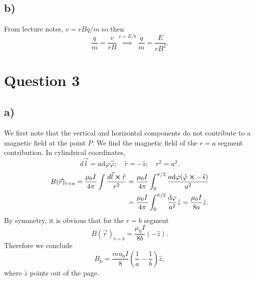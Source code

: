 \documentclass[12pt]{article}
\newcommand{\dr}{\mathrm{d}}
\theoremstyle{definition}
\theoremstyle{definition}
\theoremstyle{definition}
\theoremstyle{definition}
\theoremstyle{definition}
\theoremstyle{example}
\theoremstyle{note}
\theoremstyle{remark}
\theoremstyle{example}
\begin{document}
		\subsection*{b) }
			From lecture notes, $v = rB q / m$ so then 
			$$ \frac{q}{m} = \frac{v}{rB} \overset{v= E/b}{\implies} \frac{q}{m} = \frac{E}{rB^{2}}. $$
		\section*{Question 3}
			\subsection*{a) }
				We first note that the vertical and horizontal components do not contribute to a magnetic field at the point $P$. We find the magnetic field of the $r=a$ segment contribution. In cylindrical coordinates, 
				$$ d\vec{l} = a \dr \varphi \hat{\varphi} ; \quad \hat{r} = - \hat{s} ; \quad r^{2} = a^{2}.$$
				\begin{align*}
					B(\vec{r})_{r=a} = \frac{\mu_{0}I}{4 \pi} \int \frac{d \vec{l} \cross \hat{r}}{r^{2}} &= \frac{\mu_{0}I}{4 \pi} \int_{0}^{\pi /2} \frac{a \dr \varphi (\hat{\varphi} \cross - \hat{s})}{a^{2}} \\
					&= \frac{\mu_{0} I}{4 \pi } \int_{0}^{\pi/2} \frac{\dr \varphi}{a^{2} } \hat{z} =
					 \frac{\mu_{0}I}{8a} \hat{z}.
				\end{align*}
				By symmetry, it is obvious that for the $r=b$ segment 
				$$ B(\vec{r})_{r=b} = \frac{\mu_{0}I}{8b}(-\hat{z}).$$
				Therefore we conclude 
				$$ B_{p} = \frac{mu_{0}I}{8} \left(\frac{1}{a} - \frac{1}{b}\right) \hat{z},$$
				where $\hat{z}$ points out of the page. 
\end{document}

